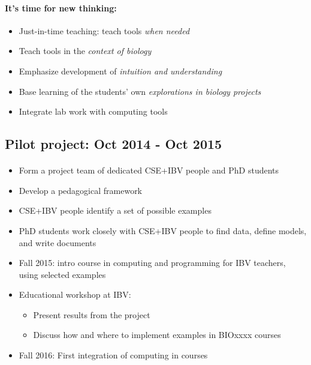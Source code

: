 \documentclass[%
twoside,                 %
final,                   %
10pt]{article}
\begin{document}
\paragraph{It's time for new thinking:}
\begin{itemize}
  \item Just-in-time teaching: teach tools \emph{when needed}

  \item Teach tools in the \emph{context of biology}

  \item Emphasize development of \emph{intuition and understanding}

  \item Base learning of the students' own \emph{explorations in biology projects}

  \item Integrate lab work with computing tools
\end{itemize}

\noindent





\subsection{Pilot project: Oct 2014 - Oct 2015}


\paragraph{}
\begin{itemize}
 \item Form a project team of dedicated CSE+IBV people and  PhD students

 \item Develop a pedagogical framework

 \item CSE+IBV people identify a set of possible examples

 \item PhD students work closely with CSE+IBV people to find data,
   define models, and write documents

 \item Fall 2015: intro course in computing and programming for IBV teachers, using selected examples

 \item Educational workshop at IBV:
\begin{itemize}

   \item Present results from the project

   \item Discuss how and where to implement examples in BIOxxxx courses

\end{itemize}

\noindent
 \item Fall 2016: First integration of computing in courses
\end{itemize}
\end{document}
